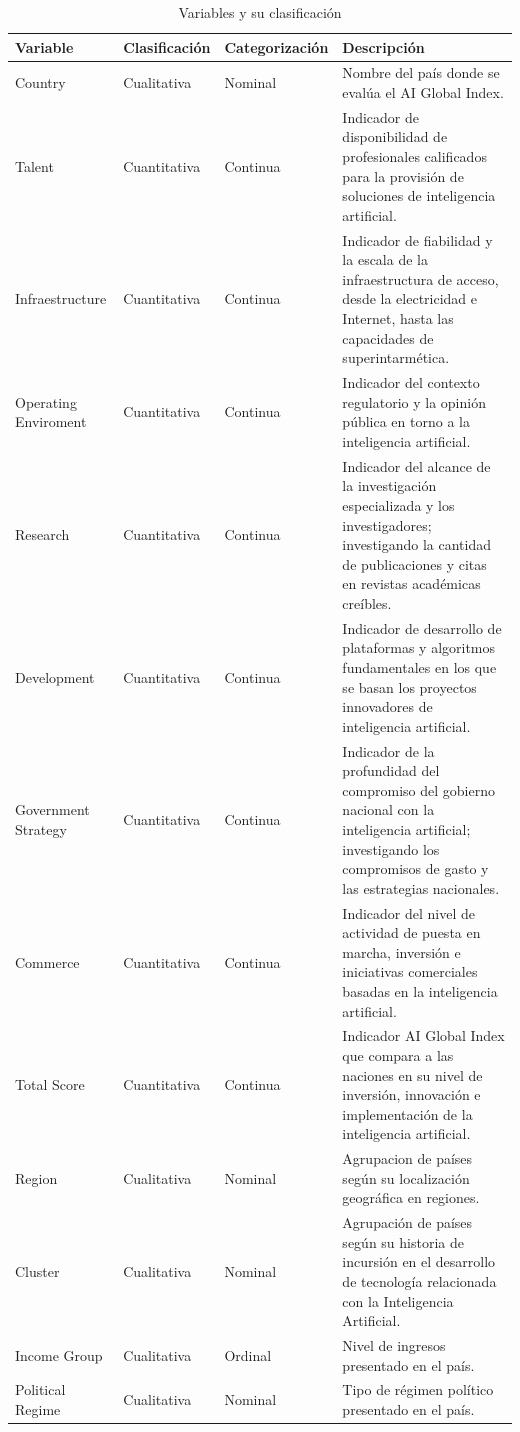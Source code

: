 \documentclass[
]{article}
\begin{document}
\renewcommand{\arraystretch}{1.5}
\begin{footnotesize}
\begin{longtable}[t]{lllp{8cm}}
\caption{\label{tab:tabla1}Variables y su clasificación}\\
\toprule
Variable & Clasificación & Categorización & Descripción\\
\midrule
Country & Cualitativa & Nominal & Nombre del país donde se evalúa el AI Global Index.\\
Talent & Cuantitativa & Continua & Indicador de disponibilidad de profesionales calificados para la provisión de soluciones de inteligencia artificial.\\
Infraestructure & Cuantitativa & Continua & Indicador de fiabilidad y la escala de la infraestructura de acceso, desde la electricidad e Internet, hasta las capacidades de superintarmética.\\
Operating Enviroment & Cuantitativa & Continua & Indicador del contexto regulatorio y la opinión pública en torno a la inteligencia artificial.\\
Research & Cuantitativa & Continua & Indicador del alcance de la investigación especializada y los investigadores; investigando la cantidad de publicaciones y citas en revistas académicas creíbles.\\
\addlinespace
Development & Cuantitativa & Continua & Indicador de desarrollo de plataformas y algoritmos fundamentales en los que se basan los proyectos innovadores de inteligencia artificial.\\
Government Strategy & Cuantitativa & Continua & Indicador de la profundidad del compromiso del gobierno nacional con la inteligencia artificial; investigando los compromisos de gasto y las estrategias nacionales.\\
Commerce & Cuantitativa & Continua & Indicador del nivel de actividad de puesta en marcha, inversión e iniciativas comerciales basadas en la inteligencia artificial.\\
Total Score & Cuantitativa & Continua & Indicador AI Global Index que compara a las naciones en su nivel de inversión, innovación e implementación de la inteligencia artificial.\\
Region & Cualitativa & Nominal & Agrupacion de países según su localización geográfica en regiones.\\
\addlinespace
Cluster & Cualitativa & Nominal & Agrupación de países según su historia de incursión en el desarrollo de tecnología relacionada con la Inteligencia Artificial.\\
Income Group & Cualitativa & Ordinal & Nivel de ingresos presentado en el país.\\
Political Regime & Cualitativa & Nominal & Tipo de régimen político presentado en el país.\\
\bottomrule
\end{longtable}

\end{footnotesize}\renewcommand{\arraystretch}{1}
\end{document}
